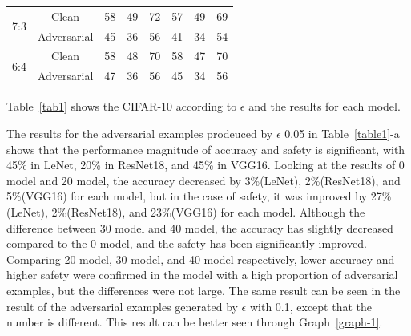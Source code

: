 \documentclass[journal,article,submit,moreauthors,pdftex]{Definitions/mdpi}
\begin{document}
\begin{specialtable}[H]
\begin{tabular}{|c|c|c|c|c|c|c|c|}
    \multirow{2}{*}{7:3}         & Clean                     & 58                  & 49                    & 72                 & 57                 & 49                    & 69                 \\ \cline{2-8} 
                                 & Adversarial               & 45                  & 36                    & 56                 & 41                 & 34                    & 54                 \\ \hline
    \multirow{2}{*}{6:4}         & Clean                     & 58                  & 48                    & 70                 & 58                 & 47                    & 70                 \\ \cline{2-8} 
                                 & Adversarial               & 47                  & 36                    & 56                 & 45                 & 34                    & 56                 \\ \hline
    \end{tabular}
\end{specialtable}

Table~\ref{tab1} shows the CIFAR-10 according to \begin{math}\epsilon\end{math} and the results for each model.

The results for the adversarial examples prodeuced by \begin{math}\epsilon\end{math} 0.05 in Table~\ref{table1}-a shows that the performance magnitude of accuracy and safety is significant, with 45\%  in LeNet, 20\% in ResNet18, and 45\% in VGG16.
Looking at the results of 0 model and 20 model, the accuracy decreased by 3\%(LeNet), 2\%(ResNet18), and 5\%(VGG16) for each model, but in the case of safety, it was improved by 27\%(LeNet), 2\%(ResNet18), and 23\%(VGG16) for each model.
Although the difference between 30 model and 40 model, the accuracy has slightly decreased compared to the 0 model, and the safety has been significantly improved.
Comparing 20 model, 30 model, and 40 model respectively, lower accuracy and higher safety were confirmed in the model with a high proportion of adversarial examples, but the differences were not large.
The same result can be seen in the result of the adversarial examples generated by \begin{math}\epsilon\end{math} with 0.1, except that the number is different. This result can be better seen through Graph~\ref{graph-1}.
\end{document}
